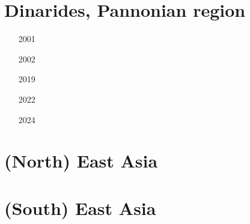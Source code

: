 \section{Dinarides, Pannonian region} 

\begin{small}
\begin{itemize}
\item[2001]
\item[2002]
\item[2019]
\item[2022]
\item[2024]
\end{itemize}
\end{small}


\section{(North) East Asia}

\begin{small}
\begin{itemize}
\item[\twothousandeighteen]
\item[\twothousandtwentyone] 
\end{itemize}
\end{small}

\section{(South) East Asia}

\begin{small}
\begin{itemize}
\item[\twothousand]
\item[\twothousandfour]
\item[\twothousandfifteen]
 \\
 \\
\item[\twothousandsixteen]
\item[\twothousandtwentytwo] 
\end{itemize}
\end{small}

